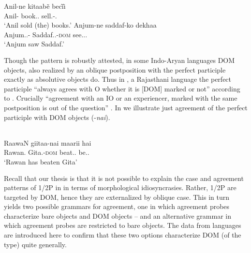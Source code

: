 \documentclass[output=paper]{langsci/langscibook}
\begin{document}
\ea%
    \label{ex:06.17}  \parencites[83]{Mohanan1995}[3]{Ahmed2006}
  	\ea
	\gll    Anil-ne     kitaabẽ     bec\~\i\~\i\\
            Anil-\Erg{}   book.\glossF.\Pl{}  sell.\Pfv-\glossF.\Pl{}\\
	\glt    ‘Anil sold (the) books.’
    \ex
	\gll    Anjum-ne   saddaf-ko   dekhaa\\
            Anjum.\glossF.\Sg-\Erg{}   Saddaf.\glossF.\Sg-\textsc{dom}   see.\Pfv.\M.\Sg{}\\
	\glt    ‘Anjum saw Saddaf.’
    \z
\z

Though the  pattern is robustly attested, in some Indo-Aryan
languages DOM
objects, also realized by an oblique postposition  with the perfect
participle exactly as absolutive objects do. Thus in , a Rajasthani
language the perfect participle “always agrees with O whether it is [DOM]
marked or not” according to \citet[234]{Verbeke2013}. Crucially “agreement with
an IO or an experiencer, marked with the same postposition is out of the
question” \parencite[234]{Verbeke2013}. In  we illustrate just
agreement of the perfect participle with \gls{DOM} objects (-\emph{nai}).

\ea%
    \label{ex:06.18} \citep{Khokhlova2002}\\
    \gll    RaawaN     giitaa-nai  maarii    hai\\
            Rawan.\M{}   Gita.\glossF-\textsc{dom}   beat.\Pfv.\glossF{}    be.\Prs.\Tsg{}\\
    \glt    ‘Rawan has beaten Gita’
\z

Recall that our thesis is that it is not possible to explain the case and
agreement patterns of 1/2P  in  in terms of morphological
idiosyncrasies. Rather, 1/2P  are targeted by DOM, hence they are
externalized by oblique case. This in turn yields two possible grammars for
agreement, one in which agreement probes characterize bare objects and DOM
objects – and an alternative grammar in which agreement probes are restricted
to bare objects. The data from  languages are introduced here to
confirm that these two options characterize \gls{DOM} (of the  type)
quite generally.
\end{document}
